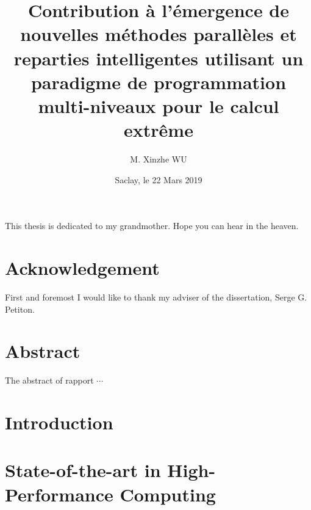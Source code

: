 \documentclass{xinzhewu}
\title{\large \textrm{Contribution \`a l’\'emergence de nouvelles m\'ethodes parall\`eles et reparties intelligentes utilisant un paradigme de programmation multi-niveaux pour le calcul extr\^eme}}
\author{M. Xinzhe WU}
\date{Saclay, le 22 Mars 2019}
\newenvironment{dedication}
{\clearpage           %
	\thispagestyle{empty}%
	\vspace*{\stretch{1}}%
	\itshape             %
	\raggedleft          %
}
{\par %
	\vspace{\stretch{3}} %
	\clearpage           %
}
\begin{document}
\maketitle
 
\clearemptydoublepage
\begin{dedication}
	This thesis is dedicated to my grandmother. Hope you can hear in the heaven.
\end{dedication}

\clearemptydoublepage

\chapter*{Acknowledgement}
\thispagestyle{empty}
First and foremost I would like to thank my adviser of the dissertation, Serge G. Petiton.

\clearemptydoublepage
\chapter*{Abstract}
\thispagestyle{empty}
The abstract of rapport $\cdots$

\clearemptydoublepage


\clearemptydoublepage

\frontmatter

{\small \tableofcontents}

{\small
\listoffigures
{}
}

{\small
\listoftables
{}
}

{\small
\listofalgorithms
{}
}

\mainmatter %

\chapter{Introduction}



\chapter{State-of-the-art in High-Performance Computing} \label{State-of-the-art in High-Performance Computing}


\end{document}
